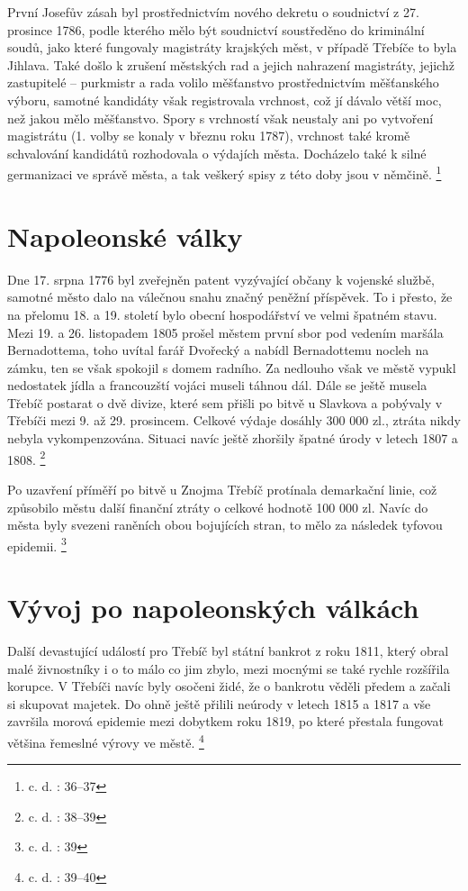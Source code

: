 \documentclass[a4paper,oneside,12p]{report}
\begin{document}
První Josefův zásah byl prostřednictvím nového dekretu o soudnictví z 27. prosince 1786, podle kterého mělo být soudnictví soustředěno do kriminální soudů, jako které fungovaly magistráty krajských měst, v případě Třebíče to byla Jihlava.
Také došlo k zrušení městských rad a jejich nahrazení magistráty, jejichž zastupitelé -- purkmistr a rada volilo měšťanstvo prostřednictvím měšťanského výboru, samotné kandidáty však registrovala vrchnost, což jí dávalo větší moc, než jakou mělo měšťanstvo.
Spory s vrchností však neustaly ani po vytvoření magistrátu (1. volby se konaly v březnu roku 1787), vrchnost také kromě schvalování kandidátů rozhodovala o výdajích města.
Docházelo také k silné germanizaci ve správě města, a tak veškerý spisy z této doby jsou v němčině. \footnote{c. d. : 36--37}

\section{Napoleonské války}

Dne 17. srpna 1776 byl zveřejněn patent vyzývající občany k vojenské službě, samotné město dalo na válečnou snahu značný peněžní příspěvek.
To i přesto, že na přelomu 18. a 19. století bylo obecní hospodářství ve velmi špatném stavu.
Mezi 19. a 26. listopadem 1805 prošel městem první sbor pod vedením maršála Bernadottema, toho uvítal farář Dvořecký a nabídl Bernadottemu nocleh na zámku, ten se však spokojil s domem radního.
Za nedlouho však ve městě vypukl nedostatek jídla a francouzští vojáci museli táhnou dál.
Dále se ještě musela Třebíč postarat o dvě divize, které sem přišli po bitvě u Slavkova a pobývaly v Třebíči mezi 9. až 29. prosincem.
Celkové výdaje dosáhly 300 000 zl., ztráta nikdy nebyla vykompenzována.
Situaci navíc ještě zhoršily špatné úrody v letech 1807 a 1808. \footnote{c. d. : 38--39}

Po uzavření příměří po bitvě u Znojma Třebíč protínala demarkační linie, což způsobilo městu další finanční ztráty o celkové hodnotě 100 000 zl.
Navíc do města byly svezeni raněních obou bojujících stran, to mělo za následek tyfovou epidemii. \footnote{c. d. : 39}

\section{Vývoj po napoleonských válkách}

Další devastující událostí pro Třebíč byl státní bankrot z roku 1811, který obral malé živnostníky i o to málo co jim zbylo, mezi mocnými se také rychle rozšířila korupce.
V Třebíči navíc byly osočeni židé, že o bankrotu věděli předem a začali si skupovat majetek.
Do ohně ještě přilili neúrody v letech 1815 a 1817 a vše završila morová epidemie mezi dobytkem roku 1819, po které přestala fungovat většina řemeslné výrovy ve městě. \footnote{c. d. : 39--40}
\end{document}
